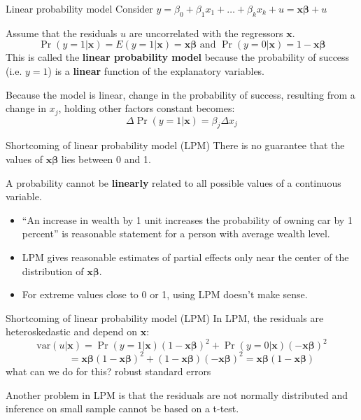 \documentclass{beamer}
\begin{document}
\begin{frame}{Linear probability model}
Consider $y=\beta_0+\beta_1x_1+\dots+\beta_kx_k+u=\mathbf{x\beta}+u$\bigskip

Assume that the residuals $u$ are uncorrelated with the regressors $\mathbf{x}$.\medskip
\[\Pr (y=1|\mathbf{x})=E(y=1|\mathbf{x})=\mathbf{x\beta} \text{ and } \Pr (y=0|\mathbf{x})=1-\mathbf{x\beta}\]
This is called the \textbf{linear probability model} because the probability of success (i.e. $y = 1$) is a \textbf{linear} function of the explanatory variables.\bigskip\medskip

Because the model is linear, change in the probability of success, resulting from a change in $x_j$, holding other factors constant becomes:
\[\Delta \Pr(y=1|\mathbf{x})=\beta_j\Delta x_j \]

\end{frame}

\begin{frame}{Shortcoming of linear probability model (LPM)}
There is no guarantee that the values of $\mathbf{x\beta}$ lies between 0 and 1.\bigskip

A probability cannot be \textbf{linearly} related to all possible values of a continuous variable.
\begin{itemize}
\item ``An increase in wealth by 1 unit increases the probability of owning car by 1 percent'' is reasonable statement for a person with average wealth level.
\item LPM gives reasonable estimates of partial effects only near the center of the distribution of $\mathbf{x\beta}$.
\item For extreme values close to 0 or 1, using LPM doesn't make sense.
\end{itemize}
\end{frame}

\begin{frame}{Shortcoming of linear probability model (LPM)}
In LPM, the residuals are heteroskedastic and depend on $\mathbf{x}$:
\[ \text{var}(u|\mathbf{x})=\Pr(y=1|\mathbf{x})(1-\mathbf{x\beta})^2+\Pr(y=0|\mathbf{x})(-\mathbf{x\beta})^2 \]
\[\qquad= \mathbf{x\beta}(1-\mathbf{x\beta})^2+(1-\mathbf{x\beta})(-\mathbf{x\beta})^2= \mathbf{x\beta}(1-\mathbf{x\beta})\]
what can we do for this? \pause  
robust standard errors \bigskip

Another problem in LPM is that the residuals are not normally distributed and inference on small sample cannot be based on a t-test.
\end{frame}
\end{document}
